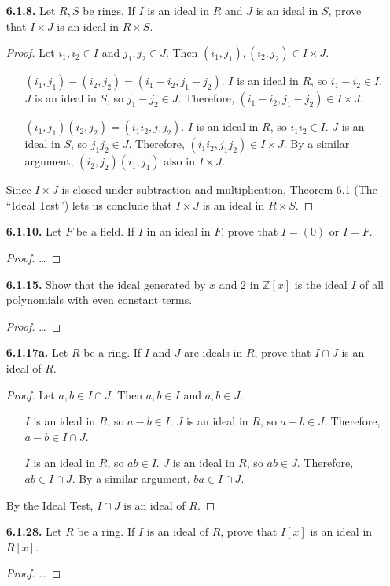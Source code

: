 \documentclass[12pt]{article}
\newcommand{\zee}{\mathbb{Z}}
\begin{document}
\begin{itemize}
	\item[\textbf{ 6.1.8.}] Let $R, S$ be rings. If $I$ is an ideal in $R$ and $J$ is an ideal in $S$, prove that $I\times J$ is an ideal in $R\times S$.
	\begin{proof}
	Let $i_1, i_2 \in I$ and $j_1, j_2 \in J$.
	Then $(i_1, j_1), (i_2, j_2) \in I\times J$.
	\begin{enumerate}
		\item[\textbullet] $(i_1, j_1) - (i_2, j_2) = (i_1 - i_2, j_1 - j_2)$. $I$ is an ideal in $R$, so $i_1 - i_2 \in I$. $J$ is an ideal in $S$, so $j_1 - j_2 \in J$. Therefore, $(i_1 - i_2, j_1 - j_2) \in I\times J$.
		\item[\textbullet] $(i_1, j_1) (i_2, j_2) = (i_1 i_2, j_1 j_2)$. $I$ is an ideal in $R$, so $i_1 i_2 \in I$. $J$ is an ideal in $S$, so $j_1 j_2 \in J$. Therefore, $(i_1 i_2, j_1 j_2) \in I\times J$. By a similar argument, $(i_2, j_2) (i_1, j_1)$ also in $I\times J$.
	\end{enumerate}
	Since $I\times J$ is closed under subtraction and multiplication, Theorem 6.1 (The ``Ideal Test'') lets us conclude that $I\times J$ is an ideal in $R\times S$.
	\end{proof}

	\item[\textbf{ 6.1.10.}] Let $F$ be a field. If $I$ in an ideal in $F$, prove that $I=(0)$ or $I=F$.
	\begin{proof}
	\dots
	\end{proof}

	\item[\textbf{ 6.1.15.}] Show that the ideal generated by $x$ and 2 in $\zee[x]$ is the ideal $I$ of all polynomials with even constant terms.
	\begin{proof}
	\dots
	\end{proof}

	\item[\textbf{ 6.1.17a.}] Let $R$ be a ring. If $I$ and $J$ are ideals in $R$, prove that $I\cap J$ is an ideal of $R$.
	\begin{proof}
		Let $a, b\in I\cap J$. Then $a, b \in I$ and $a, b \in J$.
		\begin{enumerate}
			\item[\textbullet] $I$ is an ideal in $R$, so $a-b \in I$. $J$ is an ideal in $R$, so $a-b \in J$. Therefore, $a-b \in I\cap J$.
			\item[\textbullet] $I$ is an ideal in $R$, so $ab \in I$. $J$ is an ideal in $R$, so $ab \in J$. Therefore, $ab \in I\cap J$. By a similar argument, $ba \in I\cap J$.
		\end{enumerate}
		By the Ideal Test, $I\cap J$ is an ideal of $R$.
	\end{proof}

	\item[\textbf{ 6.1.28.}] Let $R$ be a ring. If $I$ is an ideal of $R$, prove that $I[x]$ is an ideal in $R[x]$.
	\begin{proof}
	\dots
	\end{proof}


\end{itemize}
\end{document}
